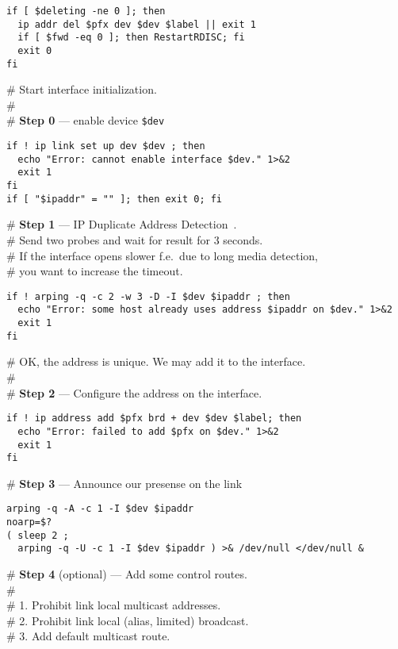 \begin{verbatim}
if [ $deleting -ne 0 ]; then
  ip addr del $pfx dev $dev $label || exit 1
  if [ $fwd -eq 0 ]; then RestartRDISC; fi
  exit 0
fi
\end{verbatim}
\begin{flushleft}
\# Start interface initialization.\\
\#\\
\# {\bf Step 0} --- enable device \verb|$dev|
\end{flushleft}
\begin{verbatim}
if ! ip link set up dev $dev ; then
  echo "Error: cannot enable interface $dev." 1>&2
  exit 1
fi
if [ "$ipaddr" = "" ]; then exit 0; fi
\end{verbatim}
\begin{flushleft}
\# {\bf Step 1} --- IP Duplicate Address Detection~\cite{RFC-DHCP}.\\
\# Send two probes and wait for result for 3 seconds.\\
\# If the interface opens slower f.e.\ due to long media detection,\\
\# you want to increase the timeout.\\
\end{flushleft}
\begin{verbatim}
if ! arping -q -c 2 -w 3 -D -I $dev $ipaddr ; then
  echo "Error: some host already uses address $ipaddr on $dev." 1>&2
  exit 1
fi
\end{verbatim}
\begin{flushleft}
\# OK, the address is unique. We may add it to the interface.\\
\#\\
\# {\bf Step 2} --- Configure the address on the interface.
\end{flushleft}
\begin{verbatim}
if ! ip address add $pfx brd + dev $dev $label; then
  echo "Error: failed to add $pfx on $dev." 1>&2
  exit 1
fi
\end{verbatim}
\noindent\# {\bf Step 3} --- Announce our presense on the link
\begin{verbatim}
arping -q -A -c 1 -I $dev $ipaddr
noarp=$?
( sleep 2 ;
  arping -q -U -c 1 -I $dev $ipaddr ) >& /dev/null </dev/null &
\end{verbatim}
\begin{flushleft}
\# {\bf Step 4} (optional) --- Add some control routes.\\
\#\\
\# 1. Prohibit link local multicast addresses.\\
\# 2. Prohibit link local (alias, limited) broadcast.\\
\# 3. Add default multicast route.
\end{flushleft}
